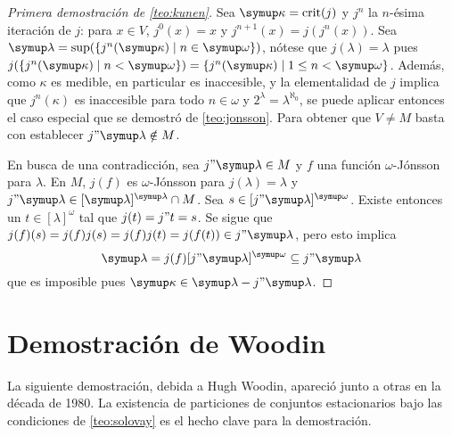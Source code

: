 \begin{proof}[Primera demostración de \ref{teo:kunen}]
    Sea $\kappa=\crit{j}$ y $j^n$ la $n$-ésima iteración de $j$: para $x\in V$, $j^0(x)=x$
    y $j^{n+1}(x) = j(j^{n}(x))$. Sea $\lambda=\sup(\set{j^n(\kappa)\mid n\in\omega})$,
    nótese que $j(\lambda)=\lambda$ pues $j(\set{j^n(\kappa)\mid n<\omega}) = \set{j^n(\kappa)\mid 1\leq n<\omega}$.
    Además, como $\kappa$ es medible, en particular es inaccesible, y la elementalidad de $j$ implica que $j^n(\kappa)$
    es inaccesible para todo $n\in\omega$ y $2^\lambda = \lambda^{\aleph_0}$, se puede aplicar entonces
    el caso especial que se demostró de \ref{teo:jonsson}.
    Para obtener que $V\neq M$ basta con establecer $j"\lambda\notin M$.

    En busca de una contradicción, sea $j"\lambda\in M$ y $f$ una función $\omega$-Jónsson para $\lambda$.
    En $M$, $j(f)$ es $\omega$-Jónsson para $j(\lambda)=\lambda$ y $j"\lambda\in[\lambda]^\lambda\cap M$.
    Sea $s\in[j"\lambda]^\omega$. Existe entonces un $t\in[\lambda]^\omega$ tal que $j(t)=j"t=s$.
    Se sigue que $j(f)(s) = j(f)j(s) = j(f)j(t) = j(f(t))\in j"\lambda$, pero esto implica
    \[
        \lambda = j(f)[j"\lambda]^\omega \subseteq j"\lambda
    \]
    que es imposible pues $\kappa\in\lambda- j"\lambda$.
\end{proof}

\section{Demostración de Woodin}

La siguiente demostración, debida a Hugh Woodin, apareció junto a otras en
la década de 1980. La existencia de particiones de conjuntos estacionarios
bajo las condiciones de \ref{teo:solovay} es el hecho clave para la demostración.

